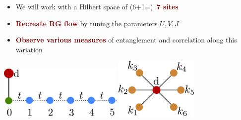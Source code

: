\documentclass[aspectratio=169]{beamer}
\newcommand{\head}[1]{
\begin{textblock*}{\textwidth}(20pt, 40pt)
\textbf{\Large {#1}}
\end{textblock*}
}
\newcommand{\focus}[1]{\textcolor{maroon}{\textbf{#1}}}
\begin{document}
\centering
\begin{frame}[noframenumbering]{}
\begin{itemize}
	\item We will work with a Hilbert space of (6+1=)~\focus{7 sites}
	\item \focus{Recreate RG flow} by tuning the parameters \(U,V,J\)
	\item \focus{Observe various measures} of entanglement and correlation along this variation
\end{itemize}

\vspace*{20pt}
\hspace{\fill}
\includegraphics[width=0.45\textwidth]{figures/seven_site.pdf}
\hspace{\fill}
\includegraphics[width=0.3\textwidth]{figures/seven_site2.pdf}
\hspace{\fill}
\end{frame}





\end{document}

